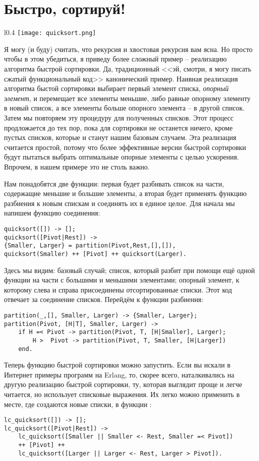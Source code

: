 \section{Быстро, сортируй!}
\begin{wrapfigure}{l}{0.4\linewidth}
    \texttt{[image: quicksort.png]}
\end{wrapfigure}
Я могу (и буду) считать, что рекурсия и хвостовая рекурсия вам ясна.
Но просто чтобы в этом убедиться, я приведу более сложный пример \--- реализацию алгоритма быстрой сортировки.
Да, традиционный <<эй, смотри, я могу писать сжатый функциональный код>> канонический пример.
Наивная реализация алгоритма быстой сортировки выбирает первый элемент списка, \emph{опорный элемент}, и перемещает все элементы меньшие, либо равные опорному элементу в новый список, а все элементы больше опорного элемента \--- в другой список.
Затем мы повторяем эту процедуру для полученных списков.
Этот процесс продложается до тех пор, пока для сортировки не останется ничего, кроме пустых списков, которые и станут нашим базовым случаем.
Эта реализация считается простой, потому что более эффективные версии быстрой сортировки будут пытаться выбрать оптимальные опорные элементы с целью ускорения.
Впрочем, в нашем примере это не столь важно.

Нам понадобятся две функции: первая будет разбивать список на части, содержащие меньшие и большие элементы, а вторая будет применять функцию разбиения к новым спискам и соединять их в единое целое.
Для начала мы напишем функцию соединения:
\begin{lstlisting}[style=erlang]
quicksort([]) -> [];
quicksort([Pivot|Rest]) ->
{Smaller, Larger} = partition(Pivot,Rest,[],[]),
quicksort(Smaller) ++ [Pivot] ++ quicksort(Larger).
\end{lstlisting}

Здесь мы видим: базовый случай; список, который разбит при помощи ещё одной функции на части с большими и меньшими элементами; опорный элемент, к которому слева и справа присоединены отсортированные списки.
Этот код отвечает за соединение списков.
Перейдём к функции разбиения:
\begin{lstlisting}[style=erlang]
partition(_,[], Smaller, Larger) -> {Smaller, Larger};
partition(Pivot, [H|T], Smaller, Larger) ->
    if H =< Pivot -> partition(Pivot, T, [H|Smaller], Larger);
        H >  Pivot -> partition(Pivot, T, Smaller, [H|Larger])
    end.
\end{lstlisting}

Теперь функцию быстрой сортировки можно запустить.
Если вы искали в Интернет примеры программ на Erlang, то, скорее всего, наталкивались на другую реализацию быстрой сортировки, ту, которая выглядит проще и легче читается, но использует списковые выражения.
Их легко можно применить в месте, где создаются новые списки, в функции :
\begin{lstlisting}[style=erlang]
lc_quicksort([]) -> [];
lc_quicksort([Pivot|Rest]) ->
    lc_quicksort([Smaller || Smaller <- Rest, Smaller =< Pivot])
    ++ [Pivot] ++
    lc_quicksort([Larger || Larger <- Rest, Larger > Pivot]).
\end{lstlisting}

